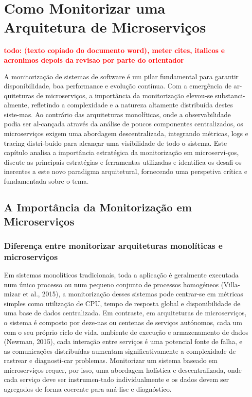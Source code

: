\chapter{Como Monitorizar uma Arquitetura de Microserviços }

\textbf{\textcolor{red}{todo: (texto copiado do documento word), meter cites, italicos e acronimos depois da revisao por parte do orientador}}

A monitorização de sistemas de software é um pilar fundamental para garantir disponibilidade, boa performance e evolução contínua. Com a emergência de ar-quiteturas de microserviços, a importância da monitorização elevou-se substanci-almente, refletindo a complexidade e a natureza altamente distribuída destes siste-mas.
Ao contrário das arquiteturas monolíticas, onde a observabilidade podia ser al-cançada através da análise de poucos componentes centralizados, os microserviços exigem uma abordagem descentralizada, integrando métricas, logs e tracing distri-buído para alcançar uma visibilidade de todo o sistema.
Este capítulo analisa a importância estratégica da monitorização em microservi-ços, discute as principais estratégias e ferramentas utilizadas e identifica os desafi-os inerentes a este novo paradigma arquitetural, fornecendo uma perspetiva crítica e fundamentada sobre o tema.


\section{A Importância da Monitorização em Microserviços}

\subsection{Diferença entre monitorizar arquiteturas monolíticas e microserviços}

Em sistemas monolíticos tradicionais, toda a aplicação é geralmente executada num único processo ou num pequeno conjunto de processos homogéneos (Villa-mizar et al., 2015), a monitorização desses sistemas pode centrar-se em métricas simples como utilização de CPU, tempo de resposta global e disponibilidade de uma base de dados centralizada.
Em contraste, em arquiteturas de microserviços, o sistema é composto por deze-nas ou centenas de serviços autónomos, cada um com o seu próprio ciclo de vida, ambiente de execução e armazenamento de dados (Newman, 2015),
cada interação entre serviços é uma potencial fonte de falha, e as comunicações distribuídas aumentam significativamente a complexidade de rastrear e diagnosti-car problemas. Monitorizar um sistema baseado em microserviços requer, por isso, uma abordagem holística e descentralizada, onde cada serviço deve ser instrumen-tado individualmente e os dados devem ser agregados de forma coerente para aná-lise e diagnóstico.

